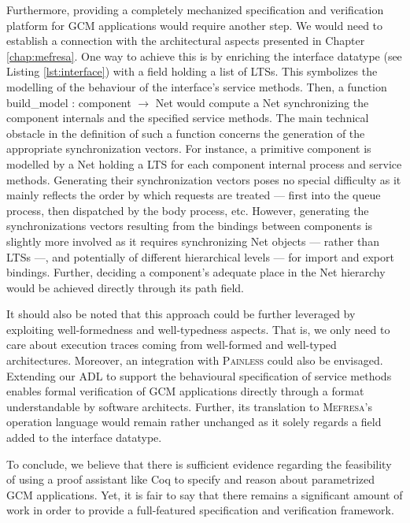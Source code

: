 	
	Furthermore, providing a completely mechanized specification and verification platform for \textsc{GCM}
	applications would require another step. We would need to establish a connection
	with the architectural aspects presented in Chapter \ref{chap:mefresa}. One way to achieve this
	is by enriching the \textsf{interface} datatype (see Listing \ref{lst:interface}) with
	a field holding a list of \textsf{LTS}s. This symbolizes the modelling 
	of the behaviour of the \textsf{interface}'s service methods. Then, a function
	\textsf{build\_model : component $\rightarrow$ Net} would compute a \textsf{Net}
	synchronizing the component internals and the specified service methods. The main
	technical obstacle in the definition of such a function concerns the generation
	of the appropriate synchronization vectors. For instance, a primitive \textsf{component} is 
	modelled by a \textsf{Net} holding a \textsf{LTS} for each \textsf{component} internal process
	and service methods. Generating their synchronization vectors poses no special difficulty as
	it mainly reflects the order by which requests are treated --- first into the \textsf{queue} process, 
	then 	dispatched by the \textsf{body} process, etc.
	However, generating the synchronizations vectors resulting from the 
	\textsf{binding}s between \textsf{component}s is slightly more involved as it requires
	synchronizing \textsf{Net} objects --- rather than \textsf{LTS}s ---, and 
	potentially of different hierarchical levels --- for \textsf{import} and \textsf{export} 
	\textsf{bindings}. Further, deciding a 
	\textsf{component}'s adequate place in the \textsf{Net}
	hierarchy would be achieved directly through its \textsf{path} field.	
			
		It should also be noted that this approach could be further leveraged 
	by exploiting well-formedness and well-typedness aspects. That is, we 
	only need to care about execution traces coming from well-formed and 
	well-typed architectures. Moreover, an integration with 
	\textsc{Painless} could also be envisaged. Extending our \ac{ADL}
	to support the behavioural
	specification of service methods enables formal verification	
	of \ac{GCM} applications directly through a format understandable by
	software architects. Further, its translation to
	\textsc{Mefresa}'s \textsf{operation} language would remain
	rather unchanged as it solely regards a field added to the \textsf{interface} datatype.
				
	
	To conclude, we believe that there is sufficient evidence regarding the
	feasibility of using a proof assistant like Coq to specify and reason
	about parametrized \ac{GCM} applications. Yet, it is fair to say that there 
	remains a significant amount of work in order to provide a full-featured
	specification and verification framework. 
	
